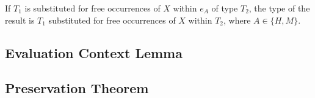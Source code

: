 If $T_{1}$ is substituted for free occurrences of $X$ within $e_{A}$ of type $T_{2}$, the type of the result is $T_{1}$ substituted for free occurrences of $X$ within $T_{2}$, where $A\in\lbrace H,M\rbrace$.



\subsection{Evaluation Context Lemma}



\subsection{Preservation Theorem}

